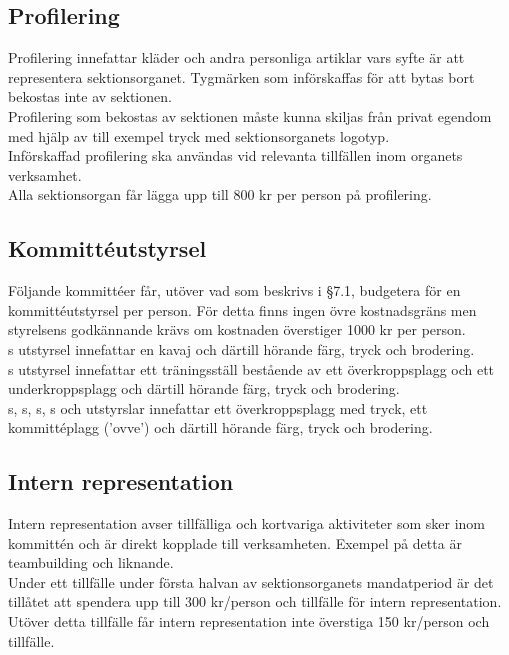 \documentclass[11pt, includeaddress]{classes/cthit}
\begin{document}
\subsection{Profilering}
Profilering innefattar kläder och andra personliga artiklar vars syfte är att representera sektionsorganet. 
Tygmärken som införskaffas för att bytas bort bekostas inte av sektionen. \\

Profilering som bekostas av sektionen måste kunna skiljas från privat egendom med hjälp av till exempel tryck med sektionsorganets logotyp. \\

Införskaffad profilering ska användas vid relevanta tillfällen inom organets verksamhet. \\

Alla sektionsorgan får lägga upp till 800 kr per person på profilering.

\subsection{Kommittéutstyrsel}
Följande kommittéer får, utöver vad som beskrivs i §7.1, budgetera för en kommittéutstyrsel per person. 
För detta finns ingen övre kostnadsgräns men styrelsens godkännande krävs om kostnaden överstiger 1000 kr per person. \\

\ARMIT{}s utstyrsel innefattar en kavaj och därtill hörande färg, tryck och brodering. \\

\FRITID{}s utstyrsel innefattar ett träningsställ bestående av ett överkroppsplagg och ett underkroppsplagg och därtill hörande färg, tryck och brodering. \\

\FLASHIT{}s, \NOLLKIT{}s, \PRIT{}s, \SEXIT{}s och \CLOUDLORDS{} utstyrslar innefattar ett överkroppsplagg med tryck, ett kommittéplagg (’ovve’) och därtill hörande färg, tryck och brodering.

\subsection{Intern representation}
Intern representation avser tillfälliga och kortvariga aktiviteter som sker inom kommittén och är direkt kopplade till verksamheten. Exempel på detta är teambuilding och liknande. \\

Under ett tillfälle under första halvan av sektionsorganets mandatperiod är det tillåtet att spendera upp till 300 kr/person och tillfälle för intern representation. Utöver detta tillfälle får intern representation inte överstiga 150 kr/person och tillfälle. \\
\end{document}
